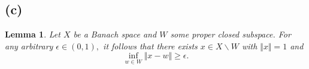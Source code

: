 \documentclass[10pt]{article}
\newtheorem{lemma}[]{Lemma}
\begin{document}
\subsection*{(c)}







\begin{lemma} \label{lem:r}
    Let $X$ be a Banach space and $W$ some proper closed subspace. For any arbitrary $\epsilon \in (0,1),$ it follows that there exists $x \in X\backslash W$ with $\Vert x\Vert = 1$ and
    \[\inf_{w\in W} \Vert x - w\Vert \ge \epsilon.\]
\end{lemma}
\end{document}
